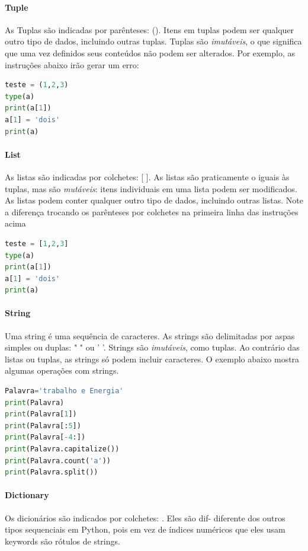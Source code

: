 \paragraph{Tuple} As Tuplas são indicadas por parênteses: (). Itens em tuplas podem ser
qualquer outro tipo de dados, incluindo outras tuplas. Tuplas são {\it imutáveis},
o que significa que uma vez definidos seus conteúdos não podem ser alterados. Por exemplo, as instruções abaixo irão gerar um erro:
\begin{lstlisting}[language=Python]
teste = (1,2,3)
type(a)
print(a[1])
a[1] = 'dois'
print(a)
\end{lstlisting}

\paragraph{List} As listas são indicadas por colchetes: [ ]. As listas são praticamente o
iguais às tuplas, mas são {\it mutáveis}: itens individuais em uma lista podem ser
modificados. As listas podem conter qualquer outro tipo de dados, incluindo outras listas. Note a diferença trocando os parênteses por colchetes na primeira linha das instruções acima
\begin{lstlisting}[language=Python]
teste = [1,2,3]
type(a)
print(a[1])
a[1] = 'dois'
print(a)
\end{lstlisting}

\paragraph{String} Uma string é uma sequência de caracteres. As strings são delimitadas por
aspas simples ou duplas: " " ou ' '. Strings são {\it imutáveis}, como tuplas. Ao contrário das listas ou tuplas, as strings só podem incluir caracteres. O exemplo abaixo mostra algumas operações com strings.
\begin{lstlisting}[language=Python]
Palavra='trabalho e Energia'
print(Palavra)
print(Palavra[1])
print(Palavra[:5])
print(Palavra[-4:])
print(Palavra.capitalize())
print(Palavra.count('a'))
print(Palavra.split())
\end{lstlisting}

\paragraph{Dictionary} Os dicionários são indicados por colchetes: { }. Eles são dif-
diferente dos outros tipos sequenciais em Python, pois em vez de índices numéricos que eles usam keywords são rótulos de strings.

